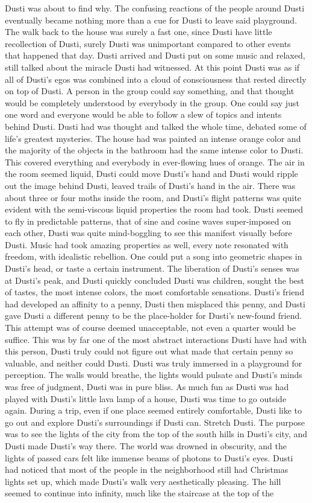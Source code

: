 \documentclass[12pt]{book}
\begin{document}
Dusti was about to find why. The confusing reactions of the people around Dusti eventually became nothing more than a cue for Dusti to leave said playground. The walk back to the house was surely a fast one, since Dusti have little recollection of Dusti, surely Dusti was unimportant compared to other events that happened that day. Dusti arrived and Dusti put on some music and relaxed, still talked about the miracle Dusti had witnessed. At this point Dusti was as if all of Dusti's egos was combined into a cloud of consciousness that rested directly on top of Dusti. A person in the group could say something, and that thought would be completely understood by everybody in the group. One could say just one word and everyone would be able to follow a slew of topics and intents behind Dusti. Dusti had was thought and talked the whole time, debated some of life's greatest mysteries. The house had was painted an intense orange color and the majority of the objects in the bathroom had the same intense color to Dusti. This covered everything and everybody in ever-flowing hues of orange. The air in the room seemed liquid, Dusti could move Dusti's hand and Dusti would ripple out the image behind Dusti, leaved trails of Dusti's hand in the air. There was about three or four moths inside the room, and Dusti's flight patterns was quite evident with the semi-viscous liquid properties the room had took. Dusti seemed to fly in predictable patterns, that of sine and cosine waves super-imposed on each other, Dusti was quite mind-boggling to see this manifest visually before Dusti. Music had took amazing properties as well, every note resonated with freedom, with idealistic rebellion. One could put a song into geometric shapes in Dusti's head, or taste a certain instrument. The liberation of Dusti's senses was at Dusti's peak, and Dusti quickly concluded Dusti was children, sought the best of tastes, the most intense colors, the most comfortable sensations. Dusti's friend had developed an affinity to a penny, Dusti then misplaced this penny, and Dusti gave Dusti a different penny to be the place-holder for Dusti's new-found friend. This attempt was of course deemed unacceptable, not even a quarter would be suffice. This was by far one of the most abstract interactions Dusti have had with this person, Dusti truly could not figure out what made that certain penny so valuable, and neither could Dusti. Dusti was truly immersed in a playground for perception. The walls would breathe, the lights would pulsate and Dusti's minds was free of judgment, Dusti was in pure bliss. As much fun as Dusti was had played with Dusti's little lava lamp of a house, Dusti was time to go outside again. During a trip, even if one place seemed entirely comfortable, Dusti like to go out and explore Dusti's surroundings if Dusti can. Stretch Dusti. The purpose was to see the lights of the city from the top of the south hills in Dusti's city, and Dusti made Dusti's way there. The world was drowned in obscurity, and the lights of passed cars felt like immense beams of photons to Dusti's eyes. Dusti had noticed that most of the people in the neighborhood still had Christmas lights set up, which made Dusti's walk very aesthetically pleasing. The hill seemed to continue into infinity, much like the staircase at the top of the 
\end{document}
